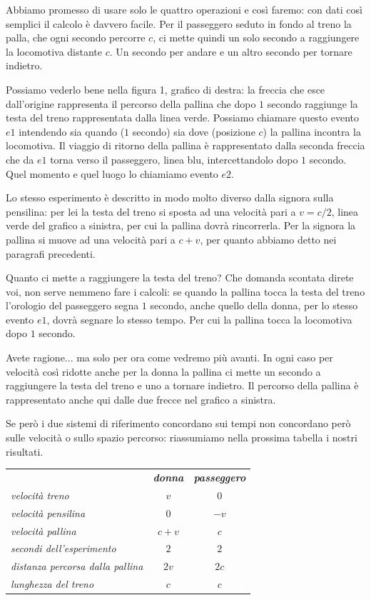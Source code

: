 Abbiamo promesso di usare solo le quattro operazioni e così faremo: con dati così semplici il calcolo è davvero facile. Per il passeggero seduto in fondo al treno la palla, che ogni secondo percorre $c$, ci mette quindi un solo secondo a raggiungere la locomotiva distante $c$.  Un secondo per andare e un altro secondo per tornare indietro.

Possiamo vederlo bene nella figura 1, grafico di destra: la freccia che esce dall'origine rappresenta il percorso della pallina che dopo $1$ secondo raggiunge la testa del treno rappresentata dalla linea verde. Possiamo chiamare questo evento $e1$ intendendo sia  quando ($1$ secondo) sia dove (posizione $c$) la pallina incontra la locomotiva. Il viaggio di ritorno della pallina è rappresentato dalla seconda freccia che da $e1$ torna verso il passeggero, linea blu, intercettandolo dopo $1$ secondo. Quel momento e quel luogo lo chiamiamo evento $e2$.

Lo stesso esperimento è descritto in modo molto diverso dalla signora sulla pensilina: per lei la testa del treno si sposta ad una velocità pari a $v=c/2$, linea verde del grafico a sinistra, per cui la pallina dovrà rincorrerla. Per la signora la pallina si muove ad una velocità pari a $c+v$, per quanto abbiamo detto nei paragrafi precedenti. 

Quanto ci mette a raggiungere la testa del treno?  Che domanda scontata direte voi, non serve nemmeno fare i calcoli: se quando la pallina tocca la testa del treno l’orologio del passeggero segna $1$ secondo, anche quello della donna, per lo stesso evento $e1$, dovrà segnare lo stesso tempo. Per cui la pallina tocca la locomotiva dopo $1$ secondo. 

Avete ragione... ma solo per ora come vedremo più avanti. In ogni caso per velocità così ridotte anche per la donna la pallina ci mette un secondo a raggiungere la testa del treno e uno a tornare indietro. Il percorso della pallina è rappresentato anche qui dalle due frecce nel grafico a sinistra. 

Se però i due sistemi di riferimento concordano sui tempi non concordano però sulle velocità o sullo spazio percorso: riassumiamo nella prossima tabella i nostri risultati.

\begin{center}
\begin{tabular}{>{\itshape}l >{\itshape}c >{\itshape}c }
\toprule
            & \textbf{donna} & \textbf{passeggero} \\
velocità treno            & $v$   & $0$  \\ 
velocità pensilina        & $0$   & $-v$  \\
velocità pallina          & $c+v$ & $c$  \\
secondi dell'esperimento  & $2$   & $2$  \\
distanza percorsa dalla pallina   & $2v$  & $2c$  \\
lunghezza del treno       & $c$   & $c$  \\
\bottomrule
\end{tabular} 
\end{center}


